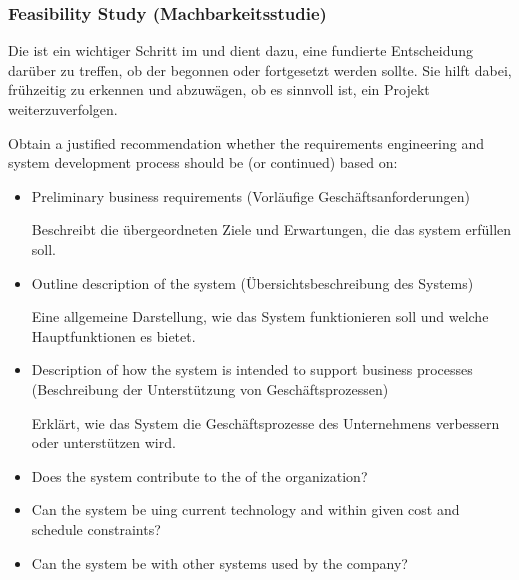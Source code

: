 \subsubsection*{Feasibility Study (Machbarkeitsstudie)}
\begin{infoBox}
    Die  ist ein wichtiger Schritt im  und dient dazu, eine fundierte Entscheidung darüber zu treffen, ob der  begonnen oder fortgesetzt werden sollte. Sie hilft dabei,  frühzeitig zu erkennen und abzuwägen, ob es sinnvoll ist, ein Projekt weiterzuverfolgen.
\end{infoBox}
\begin{defBox}[title=Objective of the Feasibility Study]
    Obtain a justified recommendation whether the requirements engineering and system development process should be  (or continued) based on:
    \begin{itemize}
        \item Preliminary business requirements (Vorläufige Geschäftsanforderungen)
        \begin{infoBox}
            Beschreibt die übergeordneten Ziele und Erwartungen, die das system erfüllen soll.
        \end{infoBox}
        \item Outline description of the system (Übersichtsbeschreibung des Systems)
        \begin{infoBox}
            Eine allgemeine Darstellung, wie das System funktionieren soll und welche Hauptfunktionen es bietet.
        \end{infoBox}
        \item Description of how the system is intended to support business processes (Beschreibung der Unterstützung von Geschäftsprozessen)
        \begin{infoBox}
            Erklärt, wie das System die Geschäftsprozesse des Unternehmens verbessern oder unterstützen wird.
        \end{infoBox}
    \end{itemize}
\end{defBox}
\begin{defBox}[title=Feasibility Report]
    \begin{itemize}
        \item Does the system contribute to the  of the organization?
        \item Can the system be  uing current technology and within given cost and schedule constraints?
        \item Can the system be  with other systems used by the company?
    \end{itemize}
\end{defBox}

